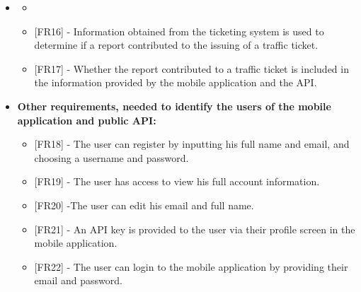 \begin{itemize}[label={}]
    \noindent{}

\item \textbf{\goalTicketAnalysis}
    \begin{itemize}[label={}]
        \item \assumptionTicketingInfo
        \item {[FR16]} - Information obtained from the ticketing system is used to determine if a report contributed to the issuing of a traffic ticket.
        \item {[FR17]} - Whether the report contributed to a traffic ticket is included in the information provided by the mobile application and the API.
    \end{itemize}

\item \textbf{Other requirements, needed to identify the users of the mobile application and public API:}
    \begin{itemize}
        \item {[FR18]} - The user can register by inputting his full name and email, and choosing a username and password.
        \item {[FR19]} - The user has access to view his full account information.
        \item {[FR20]} -The user can edit his email and full name.
        \item {[FR21]} - An API key is provided to the user via their profile screen in the mobile application.
        \item {[FR22]} - The user can login to the mobile application by providing their email and password.
    \end{itemize}
    
\end{itemize}


